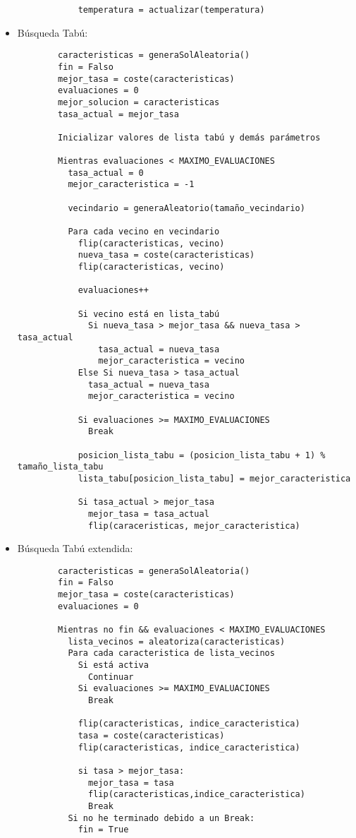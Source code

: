 \documentclass[a4paper, 11pt]{article}
\begin{document}
\begin{itemize}
\begin{verbatim}
            temperatura = actualizar(temperatura)
      \end{verbatim}
      \item Búsqueda Tabú:
      \begin{verbatim}
        caracteristicas = generaSolAleatoria()
        fin = Falso
        mejor_tasa = coste(caracteristicas)
        evaluaciones = 0
        mejor_solucion = caracteristicas
        tasa_actual = mejor_tasa

        Inicializar valores de lista tabú y demás parámetros

        Mientras evaluaciones < MAXIMO_EVALUACIONES
          tasa_actual = 0
          mejor_caracteristica = -1

          vecindario = generaAleatorio(tamaño_vecindario)

          Para cada vecino en vecindario
            flip(caracteristicas, vecino)
            nueva_tasa = coste(caracteristicas)
            flip(caracteristicas, vecino)

            evaluaciones++

            Si vecino está en lista_tabú
              Si nueva_tasa > mejor_tasa && nueva_tasa > tasa_actual
                tasa_actual = nueva_tasa
                mejor_caracteristica = vecino
            Else Si nueva_tasa > tasa_actual
              tasa_actual = nueva_tasa
              mejor_caracteristica = vecino

            Si evaluaciones >= MAXIMO_EVALUACIONES
              Break

            posicion_lista_tabu = (posicion_lista_tabu + 1) % tamaño_lista_tabu
            lista_tabu[posicion_lista_tabu] = mejor_caracteristica

            Si tasa_actual > mejor_tasa
              mejor_tasa = tasa_actual
              flip(caraceristicas, mejor_caracteristica)
      \end{verbatim}
      \item Búsqueda Tabú extendida:
      \begin{verbatim}
        caracteristicas = generaSolAleatoria()
        fin = Falso
        mejor_tasa = coste(caracteristicas)
        evaluaciones = 0

        Mientras no fin && evaluaciones < MAXIMO_EVALUACIONES
          lista_vecinos = aleatoriza(caracteristicas)
          Para cada caracteristica de lista_vecinos
            Si está activa
              Continuar
            Si evaluaciones >= MAXIMO_EVALUACIONES
              Break

            flip(caracteristicas, indice_caracteristica)
            tasa = coste(caracteristicas)
            flip(caracteristicas, indice_caracteristica)

            si tasa > mejor_tasa:
              mejor_tasa = tasa
              flip(caracteristicas,indice_caracteristica)
              Break
          Si no he terminado debido a un Break:
            fin = True
      \end{verbatim}
    \end{itemize}
\end{document}
